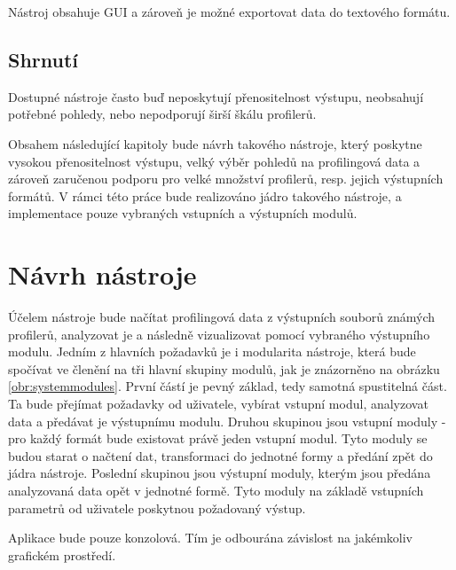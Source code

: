 \documentclass[czech,BP]{thesiskiv}
\begin{document}
Nástroj obsahuje GUI a zároveň je možné exportovat data do textového formátu.

\section{Shrnutí}

Dostupné nástroje často buď neposkytují přenositelnost výstupu, neobsahují potřebné pohledy, nebo nepodporují širší škálu profilerů.

Obsahem následující kapitoly bude návrh takového nástroje, který poskytne vysokou přenositelnost výstupu, velký výběr pohledů na profilingová data a zároveň zaručenou podporu pro velké množství profilerů, resp. jejich výstupních formátů. V rámci této práce bude realizováno jádro takového nástroje, a implementace pouze vybraných vstupních a výstupních modulů.



\newpage

\chapter{Návrh nástroje}

Účelem nástroje bude načítat profilingová data z výstupních souborů známých profilerů, analyzovat je a následně vizualizovat pomocí vybraného výstupního modulu. Jedním z hlavních požadavků je i modularita nástroje, která bude spočívat ve členění na tři hlavní skupiny modulů, jak je znázorněno na obrázku \ref{obr:systemmodules}. První částí je pevný základ, tedy samotná spustitelná část. Ta bude přejímat požadavky od uživatele, vybírat vstupní modul, analyzovat data a předávat je výstupnímu modulu. Druhou skupinou jsou vstupní moduly - pro každý formát bude existovat právě jeden vstupní modul. Tyto moduly se budou starat o načtení dat, transformaci do jednotné formy a předání zpět do jádra nástroje. Poslední skupinou jsou výstupní moduly, kterým jsou předána analyzovaná data opět v jednotné formě. Tyto moduly na základě vstupních parametrů od uživatele poskytnou požadovaný výstup.

Aplikace bude pouze konzolová. Tím je odbourána závislost na jakémkoliv grafickém prostředí.
\end{document}
